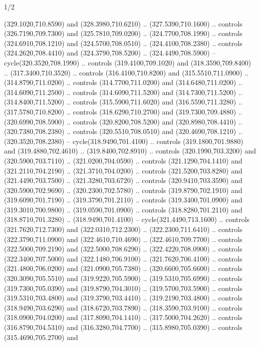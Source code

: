 \begin{flagdescription}{1/2}
\begin{scope}[xshift=0.5\flaglength]
\begin{scope}[scale=0.00745\flagwidth,xshift=-12.1mm,yshift=41.7mm]
\begin{scope}[y=0.80pt, x=0.80pt, yscale=-1, xscale=1, inner sep=0pt, outer sep=0pt]
\begin{scope}[cm={{1.33333,0.0,0.0,-1.33333,(0.0,114.66667)}}]
\begin{scope}[scale=0.100]
  (329.1020,710.8590) and (328.3980,710.6210) .. (327.5390,710.1600) .. controls
  (326.7190,709.7300) and (325.7810,709.0200) .. (324.7700,708.1990) .. controls
  (324.6910,708.1210) and (324.5700,708.0510) .. (324.4100,708.2380) .. controls
  (324.2620,708.4410) and (324.3790,708.5200) .. (324.4490,708.5900) --
  cycle(320.3520,708.1990) .. controls (319.4100,709.1020) and
  (318.3590,709.8400) .. (317.3400,710.3520) .. controls (316.4100,710.8200) and
  (315.5510,711.0900) .. (314.8790,711.0200) .. controls (314.7700,711.0200) and
  (314.6480,711.0200) .. (314.6090,711.2500) .. controls (314.6090,711.5200) and
  (314.7300,711.5200) .. (314.8400,711.5200) .. controls (315.5900,711.6020) and
  (316.5590,711.3280) .. (317.5780,710.8200) .. controls (318.6290,710.2700) and
  (319.7300,709.4880) .. (320.6990,708.5900) .. controls (320.8200,708.5200) and
  (320.8980,708.4410) .. (320.7380,708.2380) .. controls (320.5510,708.0510) and
  (320.4690,708.1210) .. (320.3520,708.2380) -- cycle(318.9490,701.4100) ..
  controls (319.1800,701.9880) and (319.4880,702.4610) .. (319.8400,702.8910) ..
  controls (320.1990,703.3200) and (320.5900,703.7110) .. (321.0200,704.0590) ..
  controls (321.1290,704.1410) and (321.2110,704.2190) .. (321.3710,704.0200) ..
  controls (321.5200,703.8280) and (321.4490,703.7500) .. (321.3280,703.6720) ..
  controls (320.9410,703.3590) and (320.5900,702.9690) .. (320.2300,702.5780) ..
  controls (319.8790,702.1910) and (319.6090,701.7190) .. (319.3790,701.2110) ..
  controls (319.3400,701.0900) and (319.3010,700.9800) .. (319.0590,701.0900) ..
  controls (318.8280,701.2110) and (318.8710,701.3280) .. (318.9490,701.4100) --
  cycle(321.4490,713.1600) .. controls (321.7620,712.7300) and
  (322.0310,712.2300) .. (322.2300,711.6410) .. controls (322.3790,711.0900) and
  (322.4610,710.4690) .. (322.4610,709.7700) .. controls (322.5000,709.2190) and
  (322.5000,708.6290) .. (322.4220,708.0900) .. controls (322.3400,707.5000) and
  (322.1480,706.9100) .. (321.7620,706.4100) .. controls (321.4800,706.0200) and
  (321.0900,705.7380) .. (320.6600,705.6600) .. controls (320.3090,705.5510) and
  (319.9220,705.5900) .. (319.5310,705.6990) .. controls (319.7300,705.0390) and
  (319.8790,704.3010) .. (319.5700,703.5900) .. controls (319.5310,703.4800) and
  (319.3790,703.4410) .. (319.2190,703.4800) .. controls (318.9490,703.6290) and
  (318.6720,703.7890) .. (318.3590,703.9100) .. controls (318.0900,704.0200) and
  (317.8090,704.1410) .. (317.5000,704.2620) .. controls (316.8790,704.5310) and
  (316.3280,704.7700) .. (315.8980,705.0390) .. controls (315.4690,705.2700) and

\end{scope}
\end{scope}
\end{scope}
\end{scope}
\end{scope}
\end{flagdescription}

